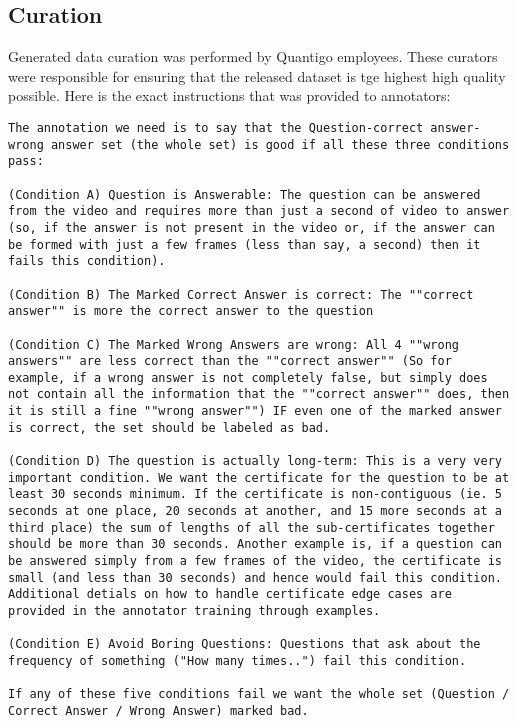 \subsection{Curation}
Generated data curation was performed by Quantigo employees. These curators were responsible for ensuring that the released \name{}{} dataset is tge highest high quality possible. Here is the exact instructions that was provided to annotators:
\begin{lstlisting}
The annotation we need is to say that the Question-correct answer-wrong answer set (the whole set) is good if all these three conditions pass:

(Condition A) Question is Answerable: The question can be answered from the video and requires more than just a second of video to answer (so, if the answer is not present in the video or, if the answer can be formed with just a few frames (less than say, a second) then it fails this condition).

(Condition B) The Marked Correct Answer is correct: The ""correct answer"" is more the correct answer to the question

(Condition C) The Marked Wrong Answers are wrong: All 4 ""wrong answers"" are less correct than the ""correct answer"" (So for example, if a wrong answer is not completely false, but simply does not contain all the information that the ""correct answer"" does, then it is still a fine ""wrong answer"") IF even one of the marked answer is correct, the set should be labeled as bad. 

(Condition D) The question is actually long-term: This is a very very important condition. We want the certificate for the question to be at least 30 seconds minimum. If the certificate is non-contiguous (ie. 5 seconds at one place, 20 seconds at another, and 15 more seconds at a third place) the sum of lengths of all the sub-certificates together should be more than 30 seconds. Another example is, if a question can be answered simply from a few frames of the video, the certificate is small (and less than 30 seconds) and hence would fail this condition. Additional detials on how to handle certificate edge cases are provided in the annotator training through examples.    

(Condition E) Avoid Boring Questions: Questions that ask about the frequency of something ("How many times..") fail this condition.

If any of these five conditions fail we want the whole set (Question / Correct Answer / Wrong Answer) marked bad. 


\end{lstlisting}
